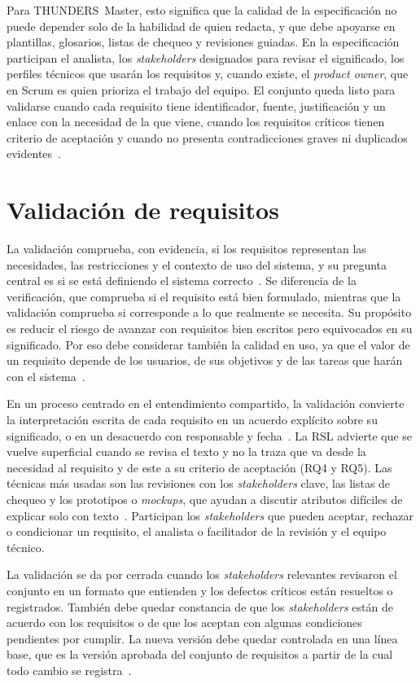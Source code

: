 \documentclass[12pt,letterpaper,oneside]{report}
\begin{document}
Para THUNDERS~Master, esto significa que la calidad de la
especificación no puede depender solo de la habilidad de quien redacta, y que
debe apoyarse en plantillas, glosarios, listas de chequeo y revisiones guiadas.
En la especificación participan el analista, los \textit{stakeholders}
designados para revisar el significado, los perfiles técnicos que usarán los
requisitos y, cuando existe, el \textit{product owner}, que en Scrum es quien
prioriza el trabajo del equipo. El conjunto queda listo para validarse cuando
cada requisito tiene identificador, fuente, justificación y un enlace con la
necesidad de la que viene, cuando los requisitos críticos tienen criterio de
aceptación y cuando no presenta contradicciones graves ni duplicados
evidentes~\cite{iso29148}.

\section{Validación de requisitos}
\label{sec:car_validacion}
La validación comprueba, con evidencia, si los requisitos representan las
necesidades, las restricciones y el contexto de uso del sistema, y su pregunta
central es si se está definiendo el sistema correcto~\cite{iso29148}. Se
diferencia de la verificación, que comprueba si el requisito está bien
formulado, mientras que la validación comprueba si corresponde a lo que
realmente se necesita. Su propósito es reducir el riesgo de avanzar con
requisitos bien escritos pero equivocados en su significado. Por eso debe
considerar también la calidad en uso, ya que el valor de un requisito depende de
los usuarios, de sus objetivos y de las tareas que harán con el
sistema~\cite{iso9241}.

En un proceso centrado en el entendimiento compartido, la validación convierte
la interpretación escrita de cada requisito en un acuerdo explícito sobre su
significado, o en un desacuerdo con responsable y fecha~\cite{glinz2015shared}.
La RSL advierte que se vuelve superficial cuando se revisa el texto y no
la traza que va desde la necesidad al requisito y de este a su criterio de
aceptación (RQ4 y RQ5). Las técnicas más usadas son las revisiones con los
\textit{stakeholders} clave, las listas de chequeo y los prototipos o
\textit{mockups}, que ayudan a discutir atributos difíciles de explicar solo con
texto~\cite{brataas2021}. Participan los \textit{stakeholders} que pueden
aceptar, rechazar o condicionar un requisito, el analista o facilitador de la
revisión y el equipo técnico.

La validación se da por cerrada cuando los \textit{stakeholders} relevantes
revisaron el conjunto en un formato que entienden y los defectos críticos están
resueltos o registrados. También debe quedar constancia de que los \textit{stakeholders} 
están de acuerdo con los requisitos o de que los aceptan con algunas condiciones 
pendientes por cumplir. La nueva versión debe quedar controlada en una línea base, 
que es la versión aprobada
del conjunto de requisitos a partir de la cual todo cambio se
registra~\cite{iso29148}. 
\end{document}
